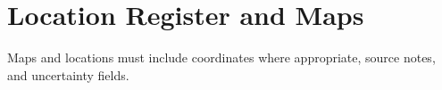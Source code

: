 \chapter{Location Register and Maps}


Maps and locations must include coordinates where appropriate, source notes, and uncertainty fields.

